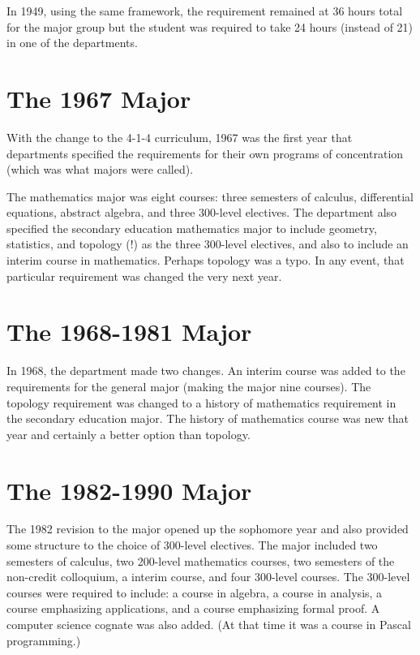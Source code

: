 \documentclass[
]{book}
\begin{document}
In 1949, using the same framework, the requirement remained at 36 hours total for the major group but the student was required to take 24 hours (instead of 21) in one of the departments.

\hypertarget{the-1967-major}{%
\section{The 1967 Major}\label{the-1967-major}}

With the change to the 4-1-4 curriculum, 1967 was the first year that departments specified the requirements for their own programs of concentration (which was what majors were called).

The mathematics major was eight courses: three semesters of calculus, differential equations, abstract algebra, and three 300-level electives. The department also specified the secondary education mathematics major to include geometry, statistics, and topology (!) as the three 300-level electives, and also to include an interim course in mathematics. Perhaps topology was a typo. In any event, that particular requirement was changed the very next year.

\hypertarget{the-1968-1981-major}{%
\section{The 1968-1981 Major}\label{the-1968-1981-major}}

In 1968, the department made two changes. An interim course was added to the requirements for the general major (making the major nine courses). The topology requirement was changed to a history of mathematics requirement in the secondary education major. The history of mathematics course was new that year and certainly a better option than topology.

\hypertarget{the-1982-1990-major}{%
\section{The 1982-1990 Major}\label{the-1982-1990-major}}

The 1982 revision to the major opened up the sophomore year and also provided some structure to the choice of 300-level electives. The major included two semesters of calculus, two 200-level mathematics courses, two semesters of the non-credit colloquium, a interim course, and four 300-level courses. The 300-level courses were required to include: a course in algebra, a course in analysis, a course emphasizing applications, and a course emphasizing formal proof. A computer science cognate was also added. (At that time it was a course in Pascal programming.)
\end{document}
